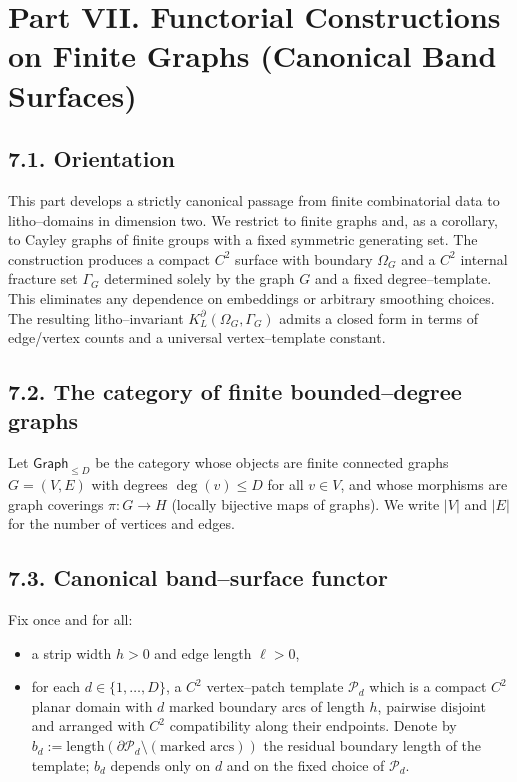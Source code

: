 \section*{Part VII. Functorial Constructions on Finite Graphs (Canonical Band Surfaces)}

\subsection*{7.1. Orientation}
This part develops a strictly canonical passage from finite combinatorial data to litho–domains in dimension two. We restrict to finite graphs and, as a corollary, to Cayley graphs of finite groups with a fixed symmetric generating set. The construction produces a compact $C^2$ surface with boundary $\Omega_G$ and a $C^2$ internal fracture set $\Gamma_G$ determined solely by the graph $G$ and a fixed degree–template. This eliminates any dependence on embeddings or arbitrary smoothing choices. The resulting litho–invariant $K_L^\partial(\Omega_G,\Gamma_G)$ admits a closed form in terms of edge/vertex counts and a universal vertex–template constant.

\subsection*{7.2. The category of finite bounded–degree graphs}
Let $\mathsf{Graph}_{\le D}$ be the category whose objects are finite connected graphs $G=(V,E)$ with degrees $\deg(v)\le D$ for all $v\in V$, and whose morphisms are graph coverings $\pi:G\to H$ (locally bijective maps of graphs). We write $|V|$ and $|E|$ for the number of vertices and edges.

\subsection*{7.3. Canonical band–surface functor}
Fix once and for all:
\begin{itemize}
\item a strip width $h>0$ and edge length $\ell>0$,
\item for each $d\in\{1,\dots,D\}$, a $C^2$ vertex–patch template $\mathcal{P}_d$ which is a compact $C^2$ planar domain with $d$ marked boundary arcs of length $h$, pairwise disjoint and arranged with $C^2$ compatibility along their endpoints. Denote by $b_d:=\mathrm{length}(\partial\mathcal{P}_d\setminus(\text{marked arcs}))$ the residual boundary length of the template; $b_d$ depends only on $d$ and on the fixed choice of $\mathcal{P}_d$.
\end{itemize}

